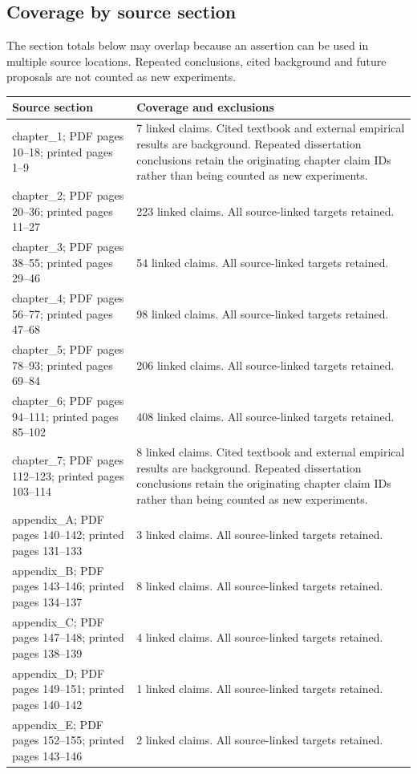 \documentclass[11pt]{article}
\begin{document}
\subsection{Coverage by source section}
The section totals below may overlap because an assertion can be used in multiple source locations. Repeated conclusions, cited background and future proposals are not counted as new experiments.
\begin{longtable}{p{105pt}p{335pt}}
\toprule Source section & Coverage and exclusions\\\midrule\endhead
chapter\_1; PDF pages 10--18; printed pages 1--9 & 7 linked claims. Cited textbook and external empirical results are background. Repeated dissertation conclusions retain the originating chapter claim IDs rather than being counted as new experiments.\\
chapter\_2; PDF pages 20--36; printed pages 11--27 & 223 linked claims. All source-linked targets retained.\\
chapter\_3; PDF pages 38--55; printed pages 29--46 & 54 linked claims. All source-linked targets retained.\\
chapter\_4; PDF pages 56--77; printed pages 47--68 & 98 linked claims. All source-linked targets retained.\\
chapter\_5; PDF pages 78--93; printed pages 69--84 & 206 linked claims. All source-linked targets retained.\\
chapter\_6; PDF pages 94--111; printed pages 85--102 & 408 linked claims. All source-linked targets retained.\\
chapter\_7; PDF pages 112--123; printed pages 103--114 & 8 linked claims. Cited textbook and external empirical results are background. Repeated dissertation conclusions retain the originating chapter claim IDs rather than being counted as new experiments.\\
appendix\_A; PDF pages 140--142; printed pages 131--133 & 3 linked claims. All source-linked targets retained.\\
appendix\_B; PDF pages 143--146; printed pages 134--137 & 8 linked claims. All source-linked targets retained.\\
appendix\_C; PDF pages 147--148; printed pages 138--139 & 4 linked claims. All source-linked targets retained.\\
appendix\_D; PDF pages 149--151; printed pages 140--142 & 1 linked claims. All source-linked targets retained.\\
appendix\_E; PDF pages 152--155; printed pages 143--146 & 2 linked claims. All source-linked targets retained.\\

\end{longtable}
\end{document}

